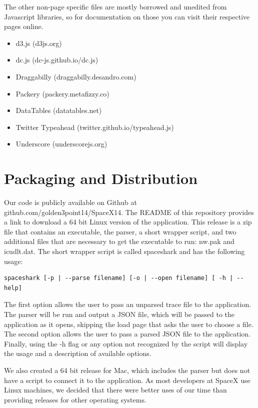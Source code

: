 \documentclass{hmcclinic}
\begin{document}
  The other non-page specific files are mostly borrowed and unedited from
  Javascript libraries, so for documentation on those you can visit their
  respective pages online.
\begin{itemize}
\item d3.js (d3js.org)
\item dc.js (dc-js.github.io/dc.js)
\item Draggabilly (draggabilly.desandro.com)
\item Packery (packery.metafizzy.co)
\item DataTables (datatables.net)
\item Twitter Typeahead (twitter.github.io/typeahead.js)
\item Underscore (underscorejs.org)
\end{itemize}

\section{Packaging and Distribution}
  Our code is publicly available on Github at
  github.com/golden3point14/SpaceX14. The README of this repository provides a link to download a
  64 bit Linux version of the application. This release is a zip file that
  contains an executable, the parser, a short wrapper script, and two additional
  files that are necessary to get the executable to run: nw.pak and icudlt.dat.
  The short wrapper script is called spaceshark and has the following usage:

\begin{verbatim}spaceshark [-p | --parse filename] [-o | --open filename] [ -h | --help]\end{verbatim}

  The first option allows the user to pass an unparsed trace file to the
  application. The parser will be run and output a JSON file, which will be
  passed to the application as it opens, skipping the load page that asks the
  user to choose a file. The second option allows the user to pass a parsed
  JSON file to the application. Finally, using the -h flag or any option
  not recognized by the script will display the usage and a description of
  available options.

  We also created a 64 bit release for Mac, which includes the parser but does
  not have a script to connect it to the application. As most developers at
  SpaceX use Linux machines, we decided that there were better uses of our time
  than providing releases for other operating systems.
\end{document}
